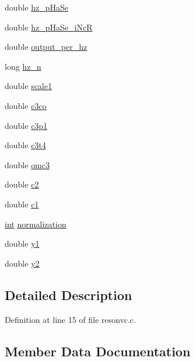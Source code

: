 \begin{DoxyCompactItemize}
\item 
double \hyperlink{structresonvc__susp__struct_a000608a4b1f62d50f85ad9a29085ac41}{hz\+\_\+p\+Ha\+Se}
\item 
double \hyperlink{structresonvc__susp__struct_a36c134de4307a78bb6bb2b148675489e}{hz\+\_\+p\+Ha\+Se\+\_\+i\+NcR}
\item 
double \hyperlink{structresonvc__susp__struct_ae2045e154fc83faf5ff4b357a68f38e2}{output\+\_\+per\+\_\+hz}
\item 
long \hyperlink{structresonvc__susp__struct_afcb4b558f2710e57d1baf5d20d91744b}{hz\+\_\+n}
\item 
double \hyperlink{structresonvc__susp__struct_ab3e63f11136d289095622962473d9d4d}{scale1}
\item 
double \hyperlink{structresonvc__susp__struct_af9653c8ca771c897bd209d2c6004b095}{c3co}
\item 
double \hyperlink{structresonvc__susp__struct_af4b10e869f8e44b51686513b65382f7e}{c3p1}
\item 
double \hyperlink{structresonvc__susp__struct_a8b98aea8005417346ce62f3f192b68e3}{c3t4}
\item 
double \hyperlink{structresonvc__susp__struct_a3e4ac0c233b8e75089a1457d64f8db1d}{omc3}
\item 
double \hyperlink{structresonvc__susp__struct_a9f2e7e09ef705cbc2584d7ab556ea3cd}{c2}
\item 
double \hyperlink{structresonvc__susp__struct_a78cd7d579da17b3a51732b4d0a886228}{c1}
\item 
\hyperlink{xmltok_8h_a5a0d4a5641ce434f1d23533f2b2e6653}{int} \hyperlink{structresonvc__susp__struct_a429a7736fb490257be0766a410bdef5e}{normalization}
\item 
double \hyperlink{structresonvc__susp__struct_ac02a1692a847782c9e020df0b55d0276}{y1}
\item 
double \hyperlink{structresonvc__susp__struct_a12b08f941cfaf56e03ef183bc7004aa0}{y2}
\end{DoxyCompactItemize}


\subsection{Detailed Description}


Definition at line 15 of file resonvc.\+c.



\subsection{Member Data Documentation}
